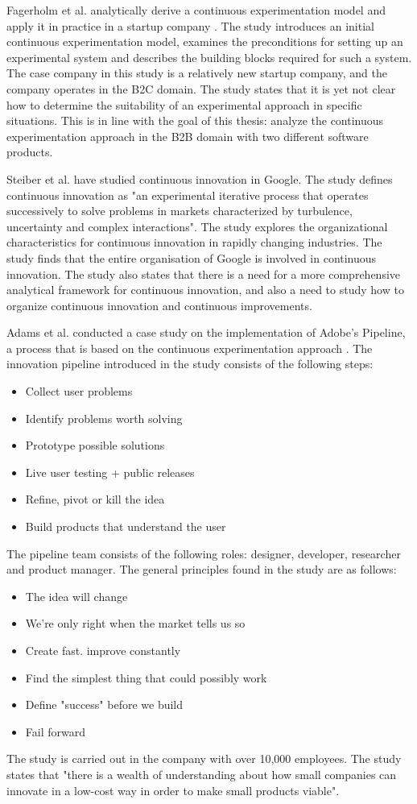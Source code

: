\documentclass[english]{tktltiki2}
\theoremstyle{definition}
\theoremstyle{remark}
\begin{document}
Fagerholm et al. analytically derive a continuous experimentation model and apply it in practice in a startup company \cite{fagerholm2014building}. The study introduces an initial continuous experimentation model, examines the preconditions for setting up an experimental system and describes the building blocks required for such a system. The case company in this study is a relatively new startup company, and the company operates in the B2C domain. The study states that it is yet not clear how to determine the suitability of an experimental approach in specific situations. This is in line with the goal of this thesis: analyze the continuous experimentation approach in the B2B domain with two different software products.

Steiber et al. \cite{steiber2013corporate} have studied continuous innovation in Google. The study defines continuous innovation as "an experimental iterative process that operates successively to solve problems in markets characterized by turbulence, uncertainty and complex interactions". The study explores the organizational characteristics for continuous innovation in rapidly changing industries. The study finds that the entire organisation of Google is involved in continuous innovation. The study also states that there is a need for a more comprehensive analytical framework for continuous innovation, and also a need to study how to organize continuous innovation and continuous improvements.   

Adams et al. conducted a case study on the implementation of Adobe's Pipeline, a process that is based on the continuous experimentation approach \cite{adams2013creating, adobe}. The innovation pipeline introduced in the study consists of the following steps:
\begin{itemize}
\item Collect user problems
\item Identify problems worth solving
\item Prototype possible solutions
\item Live user testing + public releases
\item Refine, pivot or kill the idea
\item Build products that understand the user
\end{itemize}
The pipeline team consists of the following roles: designer, developer, researcher and product manager. The general principles found in the study are as follows:
\begin{itemize}
\item The idea will change
\item We're only right when the market tells us so
\item Create fast. improve constantly
\item Find the simplest thing that could possibly work
\item Define "success" before we build
\item Fail forward
\end{itemize}
The study is carried out in the company with over 10,000 employees. The study states that "there is a wealth of understanding about how small companies can innovate in a low-cost way in order to make small products viable". 
\end{document}
